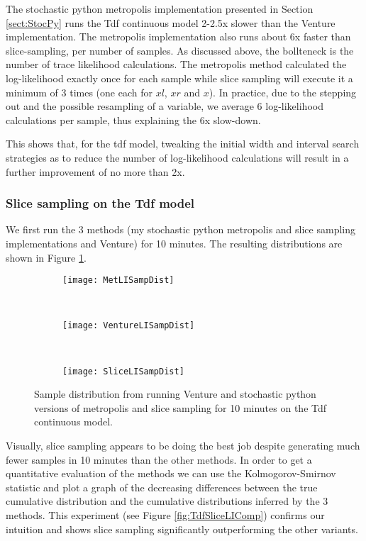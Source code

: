 The stochastic python metropolis implementation presented in Section \ref{sect:StocPy} runs the Tdf continuous model 2-2.5x slower than the Venture implementation. The metropolis implementation also runs about 6x faster than slice-sampling, per number of samples. As discussed above, the bollteneck is the number of trace likelihood calculations. The metropolis method calculated the log-likelihood exactly once for each sample while slice sampling will execute it a minimum of 3 times (one each for $xl$, $xr$ and $x$). In practice, due to the stepping out and the possible resampling of a variable, we average 6 log-likelihood calculations per sample, thus explaining the 6x slow-down.

This shows that, for the tdf model, tweaking the initial width and interval search strategies as to reduce the number of log-likelihood calculations will result in a further improvement of no more than 2x.

\subsubsection{Slice sampling on the Tdf model}
We first run the 3 methods (my stochastic python metropolis and slice sampling implementations and Venture) for 10 minutes. The resulting distributions are shown in Figure \ref{fig:tdfSampDists}.

\begin{figure}[h]
        \centering
        \begin{subfigure}[b]{0.31\textwidth}
                \centering
                \texttt{[image: MetLISampDist]}
        \end{subfigure}
        ~ 
        \begin{subfigure}[b]{0.31\textwidth}
                \centering
                \texttt{[image: VentureLISampDist]}
        \end{subfigure}
        ~ 
        \begin{subfigure}[b]{0.31\textwidth}
                \centering
                \texttt{[image: SliceLISampDist]}
        \end{subfigure}
    \caption{Sample distribution from running Venture and stochastic python versions of metropolis and slice sampling for 10 minutes on the Tdf continuous model.}
    \label{fig:tdfSampDists}
\end{figure}

Visually, slice sampling appears to be doing the best job despite generating much fewer samples in 10 minutes than the other methods. In order to get a quantitative evaluation of the methods we can use the Kolmogorov-Smirnov statistic and plot a graph of the decreasing differences between the true cumulative distribution and the cumulative distributions inferred by the 3 methods. This experiment (see Figure \ref{fig:TdfSliceLIComp}) confirms our intuition and shows slice sampling significantly outperforming the other variants. 

